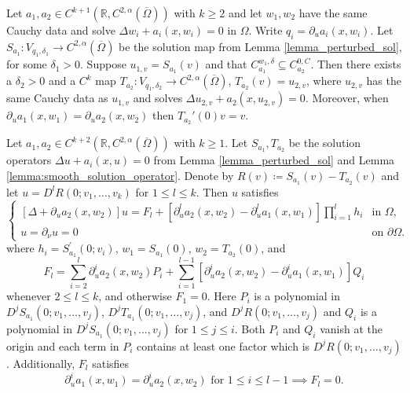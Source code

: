 \documentclass[10pt,a4paper]{amsart}
\newcommand{\Om}{\Omega}
\newcommand{\mR}{\mathbb{R}}                    %
\newcommand{\ol}[1]{\overline{#1}}
\newcommand{\p}{\partial}
\begin{document}
\begin{Lemma}\label{lemma:smooth_solution_operator}
Let $a_1,a_2\in C^{k+1}(\mR, C^{2,\alpha}(\ol{\Om}))$ with $k\geq 2$ and let $w_1,w_2$ have the same Cauchy data and solve $\Delta w_i + a_i(x,w_i) = 0$ in $\Omega$.
Write $q_i = \p_u a_i(x,w_i)$. Let $S_{a_1}\colon V_{q_1,\delta_1}\to C^{2,\alpha}(\ol{\Om})$ be the solution map from Lemma \ref{lemma_perturbed_sol}, for some $\delta_1>0$.
Suppose $u_{1,v} = S_{a_1}(v)$ and that $C_{a_1}^{w_1,\delta} \subseteq C_{a_2}^{0,C}$.
Then there exists a $\delta_2 > 0$ and a $C^k$ map $T_{a_2}\colon V_{q_1,\delta_2}\to C^{2,\alpha}(\ol{\Om})$, $T_{a_2}(v) = u_{2,v}$, where $u_{2,v}$ has the same Cauchy data as $u_{1,v}$ and solves $\Delta u_{2,v} + a_2(x,u_{2,v}) = 0$.
Moreover, when \( \partial_{u}a_{1}(x,w_{1}) = \partial_{u}a_{2}(x,w_{2}) \) then $T_{a_2}'(0)v = v$.
\end{Lemma}

\begin{Lemma}\label{lemma:inductive_higher_linearization}
Let \( a_{1},a_{2} \in C^{k+2}(\mathbb{R},C^{2,\alpha}(\ol{\Omega}))\) with $k\geq 1$.
Let \( S_{a_{1}},T_{a_2} \) be the solution operators \( \Delta u + a_{i}(x,u)=0 \) from Lemma \ref{lemma_perturbed_sol} and Lemma \ref{lemma:smooth_solution_operator}.
Denote by \( R(v)\coloneqq S_{a_{1}}(v)-T_{a_{2}}(v) \) and let \( u = D^{l}R(0; v_{1},\ldots, v_{k}) \) for \( 1 \leq l \leq k \).
Then \( u \) satisfies
\begin{equation}\label{eq-inductive_higher_linearization_new_1}
\begin{cases}
	[\Delta + \partial_{u}a_{2}(x,w_{2})]u = F_{l} + [\partial_{u}^{l}a_{2}(x,w_{2})-\partial_{u}^{l}a_{1}(x,w_{1})]\prod_{i=1}^{l}h_{i}&\text{in }\Omega, \\
	u = \partial_{\nu}u = 0&\text{on }\partial\Omega.
\end{cases}
\end{equation}
where \( h_{i} = S_{a_{1}}^{\prime}(0;v_{i}) \), \( w_{1} = S_{a_{1}}(0) \), \( w_{2} = T_{a_{2}}(0) \), and
\begin{equation*}
	F_{l} = \sum_{i=2}^{l}\partial_{u}^{i}a_{2}(x,w_{2})P_{i}+\sum_{i=1}^{l-	1}[\partial_{u}^{i}a_{2}(x,w_{2})-\partial_{u}^{i}a_{1}(x,w_{1})]Q_{i}
\end{equation*}
whenever $2\leq l\leq k$, and otherwise $F_1 = 0$.
Here \( P_{i} \) is a polynomial in \( D^{j}S_{a_{1}}(0;v_{1},\ldots, v_{j}) \), \( D^{j}T_{a_{1}}(0;v_{1},\ldots, v_{j}) \), and \( D^{j}R(0;v_{1},\ldots, v_{j}) \) and \( Q_{i} \) is a polynomial in \( D^{j}S_{a_{1}}(0;v_{1},\ldots, v_{j}) \) for \( 1\leq j\leq i \).
Both \( P_{i} \) and \( Q_{i} \) vanish at the origin and each term in \( P_{i} \) contains at least one factor which is \( D^{j}R(0;v_{1},\ldots,v_{j}) \).
Additionally, \( F_{l} \) satisfies
\begin{equation}\label{eq-inductive_higher_linearization_new_2}
	\partial_{u}^{i}a_{1}(x,w_{1}) = \partial_{u}^{i}a_{2}(x,w_{2})\text{ for }1\leq i\leq l-1\implies F_{l} = 0.
\end{equation}
\end{Lemma}
\end{document}
